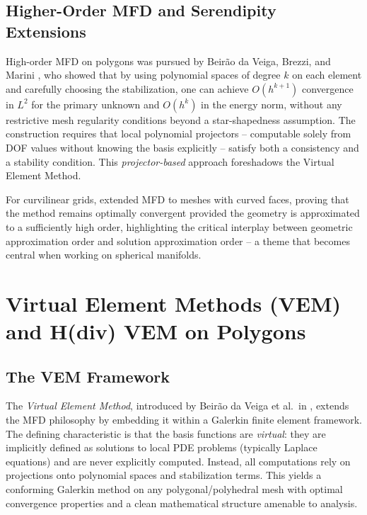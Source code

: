 \subsection{Higher-Order MFD and Serendipity Extensions}

High-order MFD on polygons was pursued by Beir\~{a}o da Veiga, Brezzi, and
Marini \cite{beiraoMFDhigh2014}, who showed that by using polynomial spaces
of degree $k$ on each element and carefully choosing the stabilization,
one can achieve $O(h^{k+1})$ convergence in $L^2$ for the primary unknown
and $O(h^k)$ in the energy norm, without any restrictive mesh regularity
conditions beyond a star-shapedness assumption. The construction requires
that local polynomial projectors -- computable solely from DOF values without
knowing the basis explicitly -- satisfy both a consistency and a stability
condition. This \emph{projector-based} approach foreshadows the Virtual
Element Method.

For curvilinear grids, \cite{lipnikov2014curvilinear} extended MFD to meshes
with curved faces, proving that the method remains optimally convergent
provided the geometry is approximated to a sufficiently high order,
highlighting the critical interplay between geometric approximation order
and solution approximation order -- a theme that becomes central when
working on spherical manifolds.

\section{Virtual Element Methods (VEM) and H(div) VEM on Polygons}

\subsection{The VEM Framework}

The \emph{Virtual Element Method}, introduced by Beir\~{a}o da Veiga et al.\
in \cite{veiga2013basic}, extends the MFD philosophy by embedding it within
a Galerkin finite element framework. The defining characteristic is that the
basis functions are \emph{virtual}: they are implicitly defined as solutions
to local PDE problems (typically Laplace equations) and are never explicitly
computed. Instead, all computations rely on projections onto polynomial spaces
and stabilization terms. This yields a conforming Galerkin method on any
polygonal/polyhedral mesh with optimal convergence properties and a clean
mathematical structure amenable to analysis.

